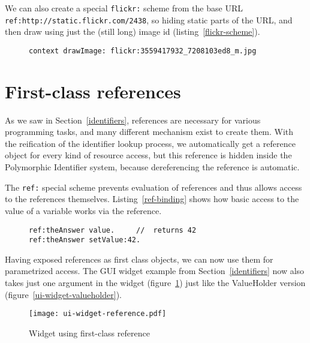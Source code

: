 \documentclass[preprint,authoryear]{llncs}
\begin{document}
We can also create a special {\tt flickr:} scheme from the base URL {\tt ref:http://static.flickr.com/2438},
so hiding static parts of the URL,
and then draw using just the (still long) image id (listing~\ref{flickr-scheme}).

\begin{figure}[htbp]
\begin{lstlisting}[style=L,label=flickr-scheme,caption=Drawing remote image via {\tt flickr:}]
context drawImage: flickr:3559417932_7208103ed8_m.jpg
\end{lstlisting}
\end{figure}


\section{First-class references}
\label{references}

As we saw in Section~\ref{identifiers}, references are necessary for various programming tasks,
and many different mechanism exist to create them.   With the reification of the identifier lookup
process, we automatically get a reference object for every kind of resource access, but this
reference is hidden inside the Polymorphic Identifier system, because dereferencing the
reference is automatic.

The {\tt ref:} special scheme prevents evaluation of references and thus allows access
to the references themselves.  Listing~\ref{ref-binding} shows how basic access to
the value of a variable works via the reference.


\begin{figure}[htbp]
\begin{lstlisting}[style=numbers,label=ref-binding,caption=Retrieve and store value via its reference.]
ref:theAnswer value.     //  returns 42
ref:theAnswer setValue:42.  
\end{lstlisting}
\end{figure}

Having exposed references as first class objects, we can now use them for parametrized 
access.  The GUI widget example from Section~\ref{identifiers} now
also takes just one argument in the widget (figure~\ref{ui-widget-reference}) just like
the ValueHolder version (figure~\ref{ui-widget-valueholder}).

\begin{figure}[htbp]
\begin{center}
\texttt{[image: ui-widget-reference.pdf]}
\caption{Widget using first-class reference}
\label{ui-widget-reference}
\end{center}
\end{figure}
\end{document}
